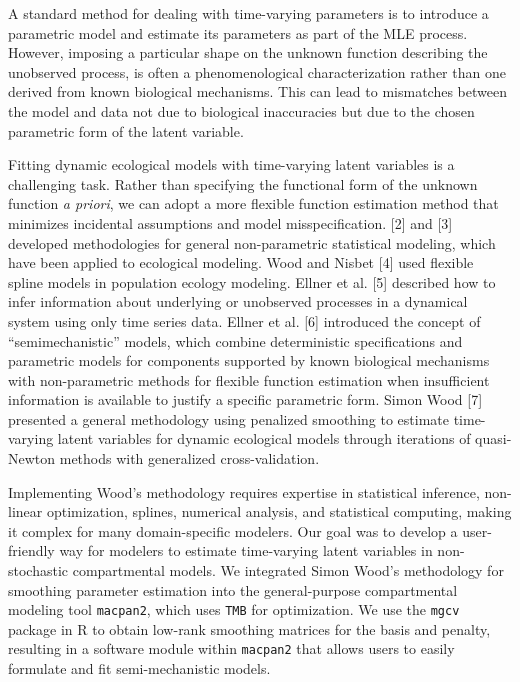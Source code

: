\documentclass[
11pt, %
oneside, %
english, %
singlespacing, %
]{macthesis} %
\begin{document}
A standard method for dealing with time-varying parameters is to introduce a parametric model and estimate its parameters as part of the MLE process. However, imposing a particular shape on the unknown function describing the unobserved process, is often a phenomenological characterization rather than one derived from known biological mechanisms. This can lead to mismatches between the model and data not due to biological inaccuracies but due to the chosen parametric form of the latent variable.

Fitting dynamic ecological models with time-varying latent variables is a challenging task. Rather than specifying the functional form of the unknown function \emph{a priori}, we can adopt a more flexible function estimation method that minimizes incidental assumptions and model misspecification. {[}2{]} and {[}3{]} developed methodologies for general non-parametric statistical modeling, which have been applied to ecological modeling. Wood and Nisbet {[}4{]} used flexible spline models in population ecology modeling. Ellner et al. {[}5{]} described how to infer information about underlying or unobserved processes in a dynamical system using only time series data. Ellner et al. {[}6{]} introduced the concept of ``semimechanistic'' models, which combine deterministic specifications and parametric models for components supported by known biological mechanisms with non-parametric methods for flexible function estimation when insufficient information is available to justify a specific parametric form. Simon Wood {[}7{]} presented a general methodology using penalized smoothing to estimate time-varying latent variables for dynamic ecological models through iterations of quasi-Newton methods with generalized cross-validation.

Implementing Wood's methodology requires expertise in statistical inference, non-linear optimization, splines, numerical analysis, and statistical computing, making it complex for many domain-specific modelers. Our goal was to develop a user-friendly way for modelers to estimate time-varying latent variables in non-stochastic compartmental models. We integrated Simon Wood's methodology for smoothing parameter estimation into the general-purpose compartmental modeling tool \texttt{macpan2}, which uses \texttt{TMB} for optimization. We use the \texttt{mgcv} package in R to obtain low-rank smoothing matrices for the basis and penalty, resulting in a software module within \texttt{macpan2} that allows users to easily formulate and fit semi-mechanistic models.
\end{document}
